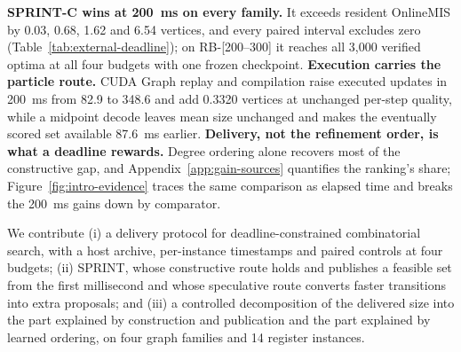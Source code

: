 \textbf{SPRINT-C wins at 200~ms on every family.} It exceeds resident OnlineMIS by 0.03, 0.68, 1.62 and 6.54 vertices, and every paired interval excludes zero (Table~\ref{tab:external-deadline}); on RB-[200--300] it reaches all 3,000 verified optima at all four budgets with one frozen checkpoint. \textbf{Execution carries the particle route.} CUDA Graph replay and compilation raise executed updates in 200~ms from 82.9 to 348.6 and add 0.3320 vertices at unchanged per-step quality, while a midpoint decode leaves mean size unchanged and makes the eventually scored set available 87.6~ms earlier. \textbf{Delivery, not the refinement order, is what a deadline rewards.} Degree ordering alone recovers most of the constructive gap, and Appendix~\ref{app:gain-sources} quantifies the ranking's share; Figure~\ref{fig:intro-evidence} traces the same comparison as elapsed time and breaks the 200~ms gains down by comparator.

We contribute (i) a delivery protocol for deadline-constrained combinatorial search, with a host archive, per-instance timestamps and paired controls at four budgets; (ii) SPRINT, whose constructive route holds and publishes a feasible set from the first millisecond and whose speculative route converts faster transitions into extra proposals; and (iii) a controlled decomposition of the delivered size into the part explained by construction and publication and the part explained by learned ordering, on four graph families and 14 register instances.


